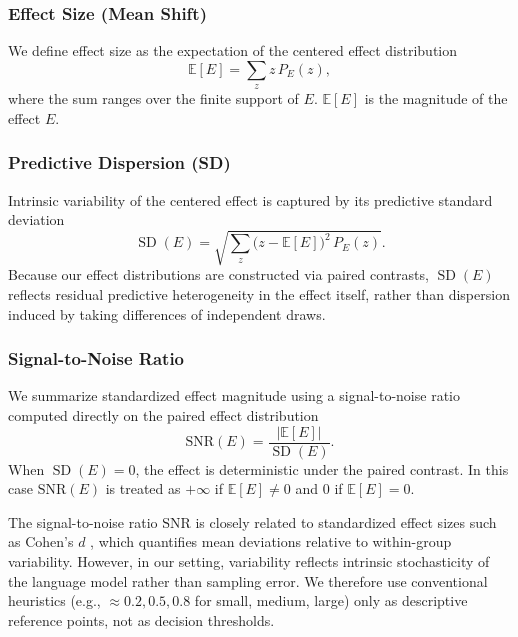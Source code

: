\subsubsection{Effect Size (Mean Shift)}

We define effect size as the expectation of the centered effect distribution
\begin{equation}
\label{eq:effect-size}
\mathbb{E}[E]
=
\sum_{z} z \, P_{E}(z),
\end{equation}
where the sum ranges over the finite support of $E$.
$\mathbb{E}[E]$ is the magnitude of the effect $E$.

\subsubsection{Predictive Dispersion (SD)}

Intrinsic variability of the centered effect is captured by its predictive
standard deviation
\begin{equation}
\label{eq:sd-effect}
\operatorname{SD}(E)
=
\sqrt{
\sum_{z}
\bigl(z - \mathbb{E}[E]\bigr)^2
\, P_{E}(z)
}.
\end{equation}
Because our effect distributions are constructed via paired contrasts,
$\operatorname{SD}(E)$ reflects residual predictive heterogeneity in the effect
itself, rather than dispersion induced by taking differences of independent
draws.

\subsubsection{Signal-to-Noise Ratio}
\label{app:snr}

We summarize standardized effect magnitude using a signal-to-noise ratio
computed directly on the paired effect distribution
\begin{equation}
\label{eq:snr}
\mathrm{SNR}(E)
=
\frac{|\mathbb{E}[E]|}{\operatorname{SD}(E)}.
\end{equation}
When $\operatorname{SD}(E)=0$, the effect is deterministic under the paired
contrast. In this case $\mathrm{SNR}(E)$ is treated as
$+\infty$ if $\mathbb{E}[E]\neq 0$ and $0$ if $\mathbb{E}[E]=0$.


The signal-to-noise ratio \(\mathrm{SNR}\) is
closely related to standardized effect sizes such as Cohen's \(d\)
\citep{cohen2013statistical}, which quantifies mean deviations relative to
within-group variability. However, in our setting, variability reflects intrinsic
stochasticity of the language model rather than sampling error. We therefore
use conventional heuristics (e.g., \(\approx 0.2, 0.5, 0.8\) for small, medium,
large) only as descriptive reference points, not as decision thresholds.



